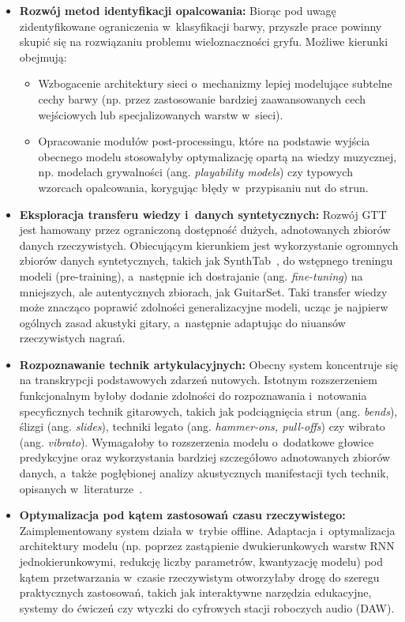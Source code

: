 \begin{itemize}
    \item \textbf{Rozwój metod identyfikacji opalcowania:} Biorąc pod uwagę zidentyfikowane ograniczenia w~klasyfikacji barwy, przyszłe prace powinny skupić się na rozwiązaniu problemu wieloznaczności gryfu. Możliwe kierunki obejmują:
    \begin{itemize}
        \item Wzbogacenie architektury sieci o~mechanizmy lepiej modelujące subtelne cechy barwy (np. przez zastosowanie bardziej zaawansowanych cech wejściowych lub specjalizowanych warstw w~sieci).
        \item Opracowanie modułów post-processingu, które na podstawie wyjścia obecnego modelu stosowałyby optymalizację opartą na wiedzy muzycznej, np. modelach grywalności (ang. \textit{playability models}) czy typowych wzorcach opalcowania, korygując błędy w~przypisaniu nut do strun.
    \end{itemize}

    \item \textbf{Eksploracja transferu wiedzy i~danych syntetycznych:} Rozwój GTT jest hamowany przez ograniczoną dostępność dużych, adnotowanych zbiorów danych rzeczywistych. Obiecującym kierunkiem jest wykorzystanie ogromnych zbiorów danych syntetycznych, takich jak SynthTab~\autocite{Zang2023SynthTab}, do wstępnego treningu modeli (pre-training), a~następnie ich dostrajanie (ang. \textit{fine-tuning}) na mniejszych, ale autentycznych zbiorach, jak GuitarSet. Taki transfer wiedzy może znacząco poprawić zdolności generalizacyjne modeli, ucząc je najpierw ogólnych zasad akustyki gitary, a~następnie adaptując do niuansów rzeczywistych nagrań.

    \item \textbf{Rozpoznawanie technik artykulacyjnych:} Obecny system koncentruje się na transkrypcji podstawowych zdarzeń nutowych. Istotnym rozszerzeniem funkcjonalnym byłoby dodanie zdolności do rozpoznawania i~notowania specyficznych technik gitarowych, takich jak podciągnięcia strun (ang. \textit{bends}), ślizgi (ang. \textit{slides}), techniki legato (ang. \textit{hammer-ons, pull-offs}) czy wibrato (ang. \textit{vibrato}). Wymagałoby to rozszerzenia modelu o~dodatkowe głowice predykcyjne oraz wykorzystania bardziej szczegółowo adnotowanych zbiorów danych, a~także pogłębionej analizy akustycznych manifestacji tych technik, opisanych w~literaturze~\autocite{Su2014SparseCepstral, Reboursiere2011GuitarController}.

    \item \textbf{Optymalizacja pod kątem zastosowań czasu rzeczywistego:} Zaimplementowany system działa w~trybie offline. Adaptacja i~optymalizacja architektury modelu (np. poprzez zastąpienie dwukierunkowych warstw RNN jednokierunkowymi, redukcję liczby parametrów, kwantyzację modelu) pod kątem przetwarzania w~czasie rzeczywistym otworzyłaby drogę do szeregu praktycznych zastosowań, takich jak interaktywne narzędzia edukacyjne, systemy do ćwiczeń czy wtyczki do cyfrowych stacji roboczych audio (DAW).
\end{itemize}

